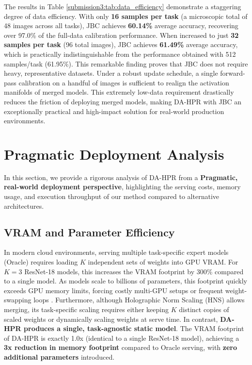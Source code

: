 \documentclass{article}
\theoremstyle{plain}
\theoremstyle{definition}
\theoremstyle{remark}
\begin{document}
The results in Table \ref{submission3:tab:data_efficiency} demonstrate a staggering degree of data efficiency. 
With only \textbf{16 samples per task} (a microscopic total of 48 images across all tasks), JBC achieves \textbf{60.14\%} average accuracy, recovering over 97.0\% of the full-data calibration performance. 
When increased to just \textbf{32 samples per task} (96 total images), JBC achieves \textbf{61.49\%} average accuracy, which is practically indistinguishable from the performance obtained with 512 samples/task (61.95\%). 
This remarkable finding proves that JBC does not require heavy, representative datasets. Under a robust update schedule, a single forward-pass calibration on a handful of images is sufficient to realign the activation manifolds of merged models. This extremely low-data requirement drastically reduces the friction of deploying merged models, making DA-HPR with JBC an exceptionally practical and high-impact solution for real-world production environments.

\section{Pragmatic Deployment Analysis}
\label{submission3:sec:deployment}

In this section, we provide a rigorous analysis of DA-HPR from a \textbf{Pragmatic, real-world deployment perspective}, highlighting the serving costs, memory usage, and execution throughput of our method compared to alternative architectures.

\subsection{VRAM and Parameter Efficiency}
In modern cloud environments, serving multiple task-specific expert models (Oracle) requires loading $K$ independent sets of weights into GPU VRAM.
For $K = 3$ ResNet-18 models, this increases the VRAM footprint by 300\% compared to a single model.
As models scale to billions of parameters, this footprint quickly exceeds GPU memory limits, forcing costly multi-GPU setups or frequent weight-swapping loops \cite{serving_latency_survey, Lee2022_multitask}.
Furthermore, although Holographic Norm Scaling (HNS) allows merging, its task-specific scaling requires either keeping $K$ distinct copies of scaled weights or dynamically scaling weights at serve time.
In contrast, \textbf{DA-HPR produces a single, task-agnostic static model}.
The VRAM footprint of DA-HPR is exactly 1.0x (identical to a single ResNet-18 model), achieving a \textbf{3x reduction in memory footprint} compared to Oracle serving, with \textbf{zero additional parameters} introduced.
\end{document}
